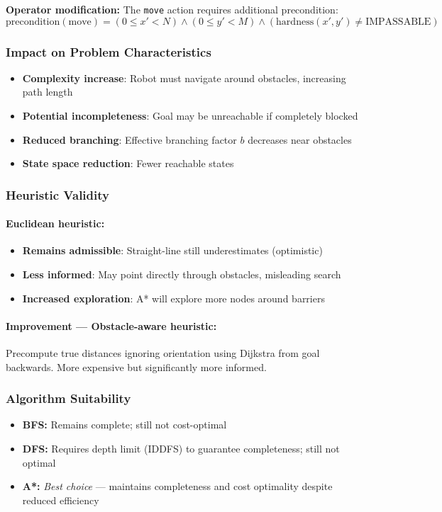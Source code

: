 \documentclass[11pt,a4paper]{article}
\begin{document}
\textbf{Operator modification:} The \texttt{move} action requires additional precondition:
$$\text{precondition}(\text{move}) = (0 \leq x' < N) \land (0 \leq y' < M) \land (\text{hardness}(x', y') \neq \text{IMPASSABLE})$$

\subsubsection{Impact on Problem Characteristics}
\begin{itemize}[leftmargin=1.5cm,itemsep=0.1em]
    \item \textbf{Complexity increase}: Robot must navigate around obstacles, increasing path length
    \item \textbf{Potential incompleteness}: Goal may be unreachable if completely blocked
    \item \textbf{Reduced branching}: Effective branching factor $b$ decreases near obstacles
    \item \textbf{State space reduction}: Fewer reachable states
\end{itemize}

\subsubsection{Heuristic Validity}
\paragraph{Euclidean heuristic:}
\begin{itemize}[leftmargin=1.5cm,itemsep=0.1em]
    \item \textbf{Remains admissible}: Straight-line still underestimates (optimistic)
    \item \textbf{Less informed}: May point directly through obstacles, misleading search
    \item \textbf{Increased exploration}: A* will explore more nodes around barriers
\end{itemize}

\paragraph{Improvement --- Obstacle-aware heuristic:}
Precompute true distances ignoring orientation using Dijkstra from goal backwards. More expensive but significantly more informed.

\subsubsection{Algorithm Suitability}
\begin{itemize}[leftmargin=1.5cm,itemsep=0.1em]
    \item \textbf{BFS:} Remains complete; still not cost-optimal
    \item \textbf{DFS:} Requires depth limit (IDDFS) to guarantee completeness; still not optimal
    \item \textbf{A*:} \textit{Best choice} --- maintains completeness and cost optimality despite reduced efficiency
\end{itemize}
\end{document}
